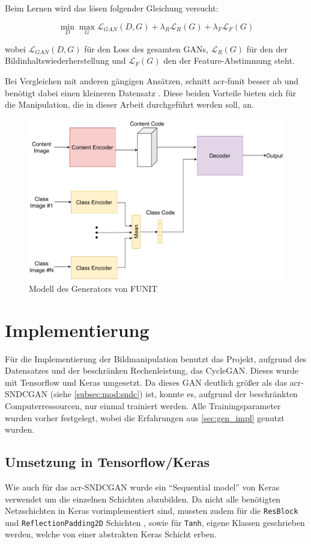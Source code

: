  Beim Lernen wird das lösen folgender Gleichung versucht:
 
 \[\min_{D} \max_{G} \mathcal{L}_{GAN}(D,G) + \lambda_R \mathcal{L}_R(G) + \lambda_F \mathcal{L}_{F}(G) \]
 
 wobei $ \mathcal{L}_{GAN}(D,G)$ für den Loss des gesamten GANs, $ \mathcal{L}_R(G)$ für den der Bildinhaltswiederherstellung und $\mathcal{L}_{F}(G) $ den der Feature-Abstimmung  steht. 
 
 Bei Vergleichen mit anderen gängigen Ansätzen, schnitt  \gls{acr-funit}  besser ab und benötigt dabei einen kleineren Datensatz \cite{liu2019few}. Diese beiden Vorteile bieten sich für die Manipulation, die in dieser Arbeit durchgeführt werden soll, an.
 
 \begin{figure}[h]
 	\centering
 	\includegraphics[width=0.8\linewidth]{images/Funit_Model_simple}
 	\caption[Modell FUNIT]{Modell des Generators von FUNIT}
 	\label{fig:funitmodelsimple}
 \end{figure}
 

 
 \section{Implementierung} %
  Für die Implementierung der Bildmanipulation benutzt das Projekt, aufgrund des Datensatzes und der beschränken Rechenleistung, das CycleGAN. Dieses wurde mit Tensorflow und Keras umgesetzt. Da dieses GAN deutlich größer als das \gls{acr-SNDCGAN} (siehe \cref{subsec:mod:sndc}) ist, konnte es, aufgrund der beschränkten Computerressourcen, nur einmal trainiert werden. Alle Trainingsparameter wurden vorher festgelegt, wobei die Erfahrungen aus \cref{sec:gen_impl} genutzt wurden.
 
 \subsection{Umsetzung in Tensorflow/Keras}
 Wie auch für das \gls{acr-SNDCGAN} wurde ein \enquote{Sequential model} von Keras~\cite{keras:SequentialModel} verwendet um die einzelnen Schichten abzubilden. Da nicht alle benötigten Netzschichten in Keras  vorimplementiert sind, mussten zudem für die \texttt{ResBlock} und \texttt{ReflectionPadding2D} Schichten \cite[vgl.][]{zhu2017unpaired}, sowie für \texttt{Tanh},  eigene Klassen geschrieben werden, welche von einer abstrakten Keras Schicht erben. 
 
